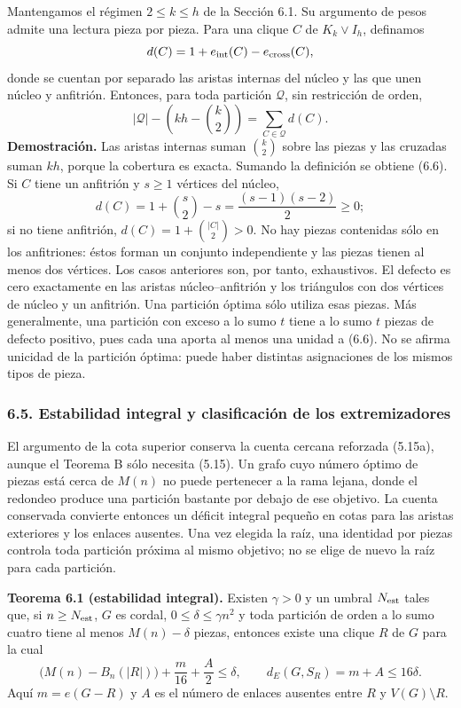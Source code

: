 \documentclass[spanish,11pt,a4paper]{article}
\begin{document}
Mantengamos el régimen \(2\le k\le h\) de la Sección 6.1. Su argumento de pesos admite una lectura pieza por pieza. Para una clique \(C\) de \(K_k\vee I_h\), definamos \[
d(C)=1+e_{\rm int}(C)-e_{\rm cross}(C),
\] donde se cuentan por separado las aristas internas del núcleo y las que unen núcleo y anfitrión. Entonces, para toda partición \(\mathcal Q\), sin restricción de orden, \[
|\mathcal Q|-\left(kh-\binom k2\right)
=\sum_{C\in\mathcal Q}d(C).
\tag{6.6}
\] \textbf{Demostración.} Las aristas internas suman \(\binom k2\) sobre las piezas y las cruzadas suman \(kh\), porque la cobertura es exacta. Sumando la definición se obtiene (6.6). Si \(C\) tiene un anfitrión y \(s\ge1\) vértices del núcleo, \[
d(C)=1+\binom s2-s=\frac{(s-1)(s-2)}2\ge0;
\] si no tiene anfitrión, \(d(C)=1+\binom{|C|}2>0\). No hay piezas contenidas sólo en los anfitriones: éstos forman un conjunto independiente y las piezas tienen al menos dos vértices. Los casos anteriores son, por tanto, exhaustivos. El defecto es cero exactamente en las aristas núcleo--anfitrión y los triángulos con dos vértices de núcleo y un anfitrión. Una partición óptima sólo utiliza esas piezas. Más generalmente, una partición con exceso a lo sumo \(t\) tiene a lo sumo \(t\) piezas de defecto positivo, pues cada una aporta al menos una unidad a (6.6). No se afirma unicidad de la partición óptima: puede haber distintas asignaciones de los mismos tipos de pieza.

\subsubsection{6.5. Estabilidad integral y clasificación de los extremizadores}\label{estabilidad-integral-y-clasificacion-de-los-extremizadores}

El argumento de la cota superior conserva la cuenta cercana reforzada (5.15a), aunque el Teorema B sólo necesita (5.15). Un grafo cuyo número óptimo de piezas está cerca de \(M(n)\) no puede pertenecer a la rama lejana, donde el redondeo produce una partición bastante por debajo de ese objetivo. La cuenta conservada convierte entonces un déficit integral pequeño en cotas para las aristas exteriores y los enlaces ausentes. Una vez elegida la raíz, una identidad por piezas controla toda partición próxima al mismo objetivo; no se elige de nuevo la raíz para cada partición.


\textbf{Teorema 6.1 (estabilidad integral).} Existen \(\gamma>0\) y un umbral \(N_{\rm est}\) tales que, si \(n\ge N_{\rm est}\), \(G\) es cordal, \(0\le\delta\le\gamma n^2\) y toda partición de orden a lo sumo cuatro tiene al menos \(M(n)-\delta\) piezas, entonces existe una clique \(R\) de \(G\) para la cual \[
\bigl(M(n)-B_n(|R|)\bigr)+\frac m{16}+\frac A2\le\delta,
\qquad
d_E(G,S_R)=m+A\le16\delta.
\tag{6.7}
\] Aquí \(m=e(G-R)\) y \(A\) es el número de enlaces ausentes entre \(R\) y \(V(G)\setminus R\).
\end{document}
